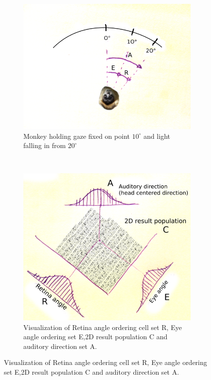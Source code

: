 \documentclass[a4paper, 12pt]{article}
\begin{document}
\begin{figure}[H]
	\centering
	\begin{subfigure}[b]{0.5\textwidth}
		\centering
		\includegraphics[width=\textwidth]{ape-picture.png}
		\caption{Monkey holding gaze fixed on point $10^\circ$ and light falling in from $20^\circ$}
	\end{subfigure}%
	~
	\begin{subfigure}[b]{0.5\textwidth}
		\centering
		\includegraphics[width=\textwidth]{Retina-Eye-Auditory.png}
		\caption{Visualization of Retina angle ordering cell set R, Eye angle ordering set E,2D result population C and auditory direction set A.}
	\end{subfigure}
\end{figure}
\end{document}
